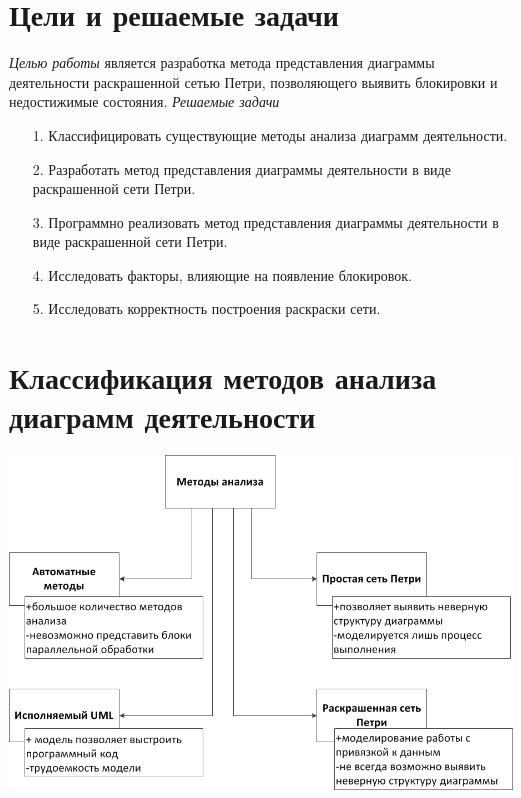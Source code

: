 \documentclass[12pt]{article}
\begin{document}
\TitleSlide

\section{Цели и решаемые задачи}

\emph{Целью работы} является разработка метода представления диаграммы деятельности раскрашенной сетью Петри, позволяющего выявить блокировки и недостижимые состояния.
 
\emph{Решаемые задачи}
\begin{small}
	\begin{enumerate}
	\item[1.] Классифицировать существующие методы анализа диаграмм деятельности.
	\item[2.] Разработать метод представления диаграммы деятельности в виде раскрашенной сети Петри.
	\item[3.] Программно реализовать метод представления диаграммы деятельности в виде раскрашенной сети Петри.
	\item[4.] Исследовать факторы, влияющие на появление блокировок.
	\item[5.] Исследовать корректность построения раскраски сети.
	\end{enumerate}
\end{small}

\section{Классификация методов анализа диаграмм деятельности}

\begin{center}
\includegraphics[scale=0.85]{../tex/include/MethodClassification.png}
\end{center}
\end{document}
